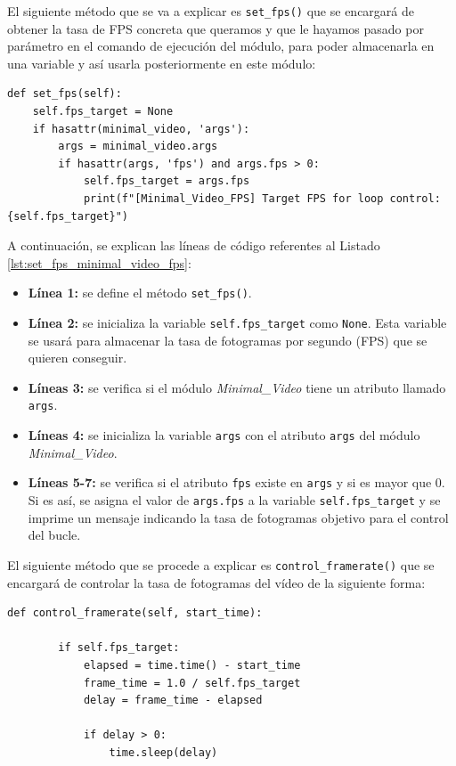 El siguiente método que se va a explicar es \texttt{set\_fps()} que se encargará de obtener la tasa de FPS concreta que queramos y que le hayamos pasado por parámetro en el comando de ejecución del módulo, para poder almacenarla en una variable y así usarla posteriormente en este módulo:
\begin{lstlisting}[style=pythonstyle, caption={Método \texttt{set\_fps()} de \textit{Minimal\_Video\_FPS}.}, label={lst:set_fps_minimal_video_fps}]
def set_fps(self):
    self.fps_target = None
    if hasattr(minimal_video, 'args'):
        args = minimal_video.args
        if hasattr(args, 'fps') and args.fps > 0:
            self.fps_target = args.fps
            print(f"[Minimal_Video_FPS] Target FPS for loop control: {self.fps_target}")
\end{lstlisting}
\vspace{\baselineskip}

A continuación, se explican las líneas de código referentes al Listado \ref{lst:set_fps_minimal_video_fps}:
\begin{itemize}
    \item \textbf{Línea 1:} se define el método \texttt{set\_fps()}.
    \item \textbf{Línea 2:} se inicializa la variable \texttt{self.fps\_target} como \texttt{None}. Esta variable se usará para almacenar la tasa de fotogramas por segundo (FPS) que se quieren conseguir.
    \item \textbf{Líneas 3:} se verifica si el módulo \textit{Minimal\_Video} tiene un atributo llamado \texttt{args}.
    \item \textbf{Líneas 4:} se inicializa la variable \texttt{args} con el atributo \texttt{args} del módulo \textit{Minimal\_Video}.
    \item \textbf{Líneas 5-7:} se verifica si el atributo \texttt{fps} existe en \texttt{args} y si es mayor que 0. Si es así, se asigna el valor de \texttt{args.fps} a la variable \texttt{self.fps\_target} y se imprime un mensaje indicando la tasa de fotogramas objetivo para el control del bucle.
\end{itemize}
\vspace{\baselineskip}

El siguiente método que se procede a explicar es \texttt{control\_framerate()} que se encargará de controlar la tasa de fotogramas del vídeo de la siguiente forma:
\begin{lstlisting}[style=pythonstyle, caption={Método \texttt{control\_framerate()} de \textit{Minimal\_Video\_FPS}.}, label={lst:control_framerate_minimal_video_fps}]
def control_framerate(self, start_time):

        if self.fps_target:
            elapsed = time.time() - start_time
            frame_time = 1.0 / self.fps_target
            delay = frame_time - elapsed 
            
            if delay > 0:
                time.sleep(delay)
\end{lstlisting}
\vspace{\baselineskip}

